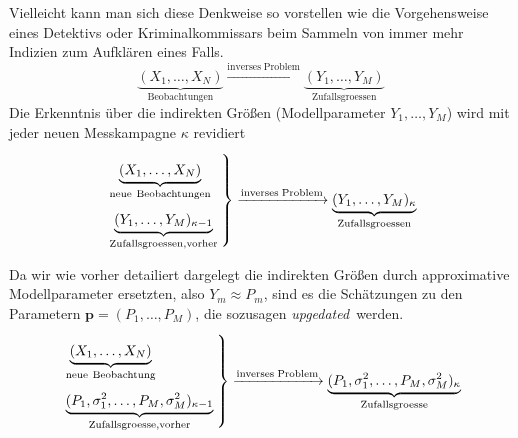 \begin{enumerate}
Vielleicht kann man sich diese Denkweise so vorstellen wie die Vorgehensweise eines Detektivs
oder Kriminalkommissars beim Sammeln von immer mehr Indizien zum Aufklären eines Falls.
\begin{equation}
\underbrace{(X_1, \dots, X_N)}_{\mathrm{Beobachtungen}} \xrightarrow{\mathrm{inverses \; Problem}}
\underbrace{(Y_1, \dots, Y_M)}_{\mathrm{Zufallsgroessen}} 
\end{equation}
Die Erkenntnis über die indirekten Größen (Modellparameter $Y_1, \dots, Y_M$) wird mit jeder
neuen Messkampagne $\kappa$ revidiert
\begin{equation}
\arraycolsep=2.4pt\def\arraystretch{2}
\left.
\begin{array}{l}
\underbrace{(X_1, \dots, X_N)}_{\mathrm{neue~Beobachtungen}}\\
\underbrace{(Y_1, \dots, Y_M)_{\kappa-1}}_{\mathrm{Zufallsgroessen, vorher}} 
\end{array}\right\}
 \xrightarrow{\mathrm{inverses \; Problem}}
\underbrace{(Y_1, \dots, Y_M)_{\kappa}}_{\mathrm{Zufallsgroessen}} 
\end{equation}
\end{enumerate}
Da wir wie vorher detailiert dargelegt die indirekten Größen durch approximative Modellparameter ersetzten,
also $Y_m \approx P_m$, sind es die Schätzungen zu den Parametern $\mathbf{p} = (P_1,\dots,P_M)$, die
sozusagen \glqq\textsl{upgedated}\grqq ~werden.
\begin{equation}
\arraycolsep=2.4pt\def\arraystretch{2}
\left.
\begin{array}{l}
\underbrace{(X_1, \dots, X_N)}_{\mathrm{neue~Beobachtung}}\\
\underbrace{(P_1, \sigma^2_1, \dots, P_M, \sigma^2_M)_{\kappa-1}}_{\mathrm{Zufallsgroesse, vorher}} 
\end{array}\right\}
 \xrightarrow{\mathrm{inverses \; Problem}}
\underbrace{(P_1, \sigma^2_1, \dots, P_M, \sigma^2_M)_{\kappa}}_{\mathrm{Zufallsgroesse}} 
\end{equation}

